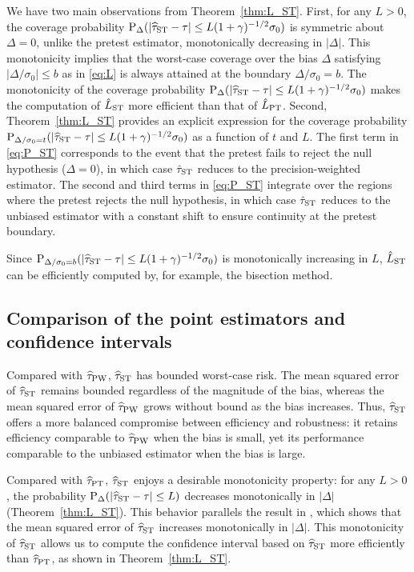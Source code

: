 \documentclass[11pt]{article}
\def\P{{\mathrm P}}
\newcommand{\htau}{\widehat\tau}
\numberwithin{equation}{section}
\theoremstyle{definition}
\begin{document}
We have two main observations from Theorem~\ref{thm:L_ST}. First, for any $L>0$, the coverage probability $\P_\Delta(\lvert \htau_{\rm ST} - \tau \rvert \le L (1+\gamma)^{-1/2} \sigma_0)$ is symmetric about $\Delta=0$, unlike the pretest estimator, monotonically decreasing in $\lvert \Delta \rvert$. This monotonicity implies that the worst-case coverage over the bias $\Delta$ satisfying $\lvert \Delta/\sigma_0 \rvert \le b$ as in \eqref{eq:L} is always attained at the boundary $\Delta/\sigma_0 = b$. The monotonicity of the coverage probability $\P_\Delta(\lvert \htau_{\rm ST} - \tau \rvert \le L (1+\gamma)^{-1/2} \sigma_0)$ makes the computation of $\hat{L}_{\rm ST}$ more efficient than that of $\hat{L}_{\rm PT}$. Second, Theorem~\ref{thm:L_ST} provides an explicit expression for the coverage probability $\P_{\Delta/\sigma_0 = t}(\lvert \htau_{\rm ST} - \tau \rvert \le L (1+\gamma)^{-1/2} \sigma_0)$ as a function of $t$ and $L$. The first term in \eqref{eq:P_ST} corresponds to the event that the pretest fails to reject the null hypothesis ($\Delta = 0$), in which case $\hat\tau_{\rm ST}$ reduces to the precision-weighted estimator. The second and third terms in \eqref{eq:P_ST} integrate over the regions where the pretest rejects the null hypothesis, in which case $\hat\tau_{\rm ST}$ reduces to the unbiased estimator with a constant shift to ensure continuity at the pretest boundary.

Since $\P_{\Delta/\sigma_0 = b}(\lvert \htau_{\rm ST}- \tau \rvert \le L (1+\gamma)^{-1/2} \sigma_0)$ is monotonically increasing in $L$, $\hat{L}_{\rm ST}$ can be efficiently computed by, for example, the bisection method.

\subsection{Comparison of the point estimators and confidence intervals}


Compared with $\htau_{\rm PW}$, $\htau_{\rm ST}$ has bounded worst-case risk. The mean squared error of $\htau_{\rm ST}$ remains bounded regardless of the magnitude of the bias, whereas the mean squared error of $\htau_{\rm PW}$ grows without bound as the bias increases. Thus, $\htau_{\rm ST}$ offers a more balanced compromise between efficiency and robustness: it retains efficiency comparable to $\htau_{\rm PW}$ when the bias is small, yet its performance comparable to the unbiased estimator when the bias is large.

Compared with $\htau_{\rm PT}$, $\htau_{\rm ST}$ enjoys a desirable monotonicity property: for any $L > 0$, the probability $\P_{\Delta}(\lvert \htau_{\rm ST}- \tau \rvert \le L)$ decreases monotonically in $\lvert \Delta \rvert$ (Theorem~\ref{thm:L_ST}). This behavior parallels the result in \cite{bickel1983minimax}, which shows that the mean squared error of $\htau_{\rm ST}$ increases monotonically in $\lvert \Delta \rvert$. This monotonicity of $\htau_{\rm ST}$ allows us to compute the confidence interval based on $\htau_{\rm ST}$ more efficiently than $\htau_{\rm PT}$, as shown in Theorem~\ref{thm:L_ST}.
\end{document}

